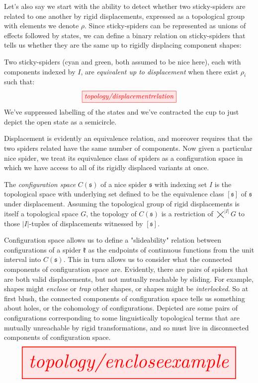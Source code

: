 Let's also say we start with the ability to detect whether two sticky-spiders are related to one another by rigid displacements, expressed as a topological group with elements we denote $\rho$. Since sticky-spiders can be represented as unions of effects followed by states, we can define a binary relation on sticky-spiders that tells us whether they are the same up to rigidly displacing component shapes:

\begin{defn}
Two sticky-spiders (cyan and green, both assumed to be nice here), each with components indexed by $I$, are \emph{equivalent up to displacement} when there exist $\rho_i$ such that:
\[\tikzfig{topology/displacementrelation}\]
We've suppressed labelling of the states and we've contracted the cup to just depict the open state as a semicircle.
\end{defn}

Displacement is evidently an equivalence relation, and moreover requires that the two spiders related have the same number of components. Now given a particular nice spider, we treat its equivalence class of spiders as a configuration space in which we have access to all of its rigidly displaced variants at once.

\begin{defn}\label{defn:configurationspace}
The \emph{configuration space} $C(\mathfrak{s})$ of a nice spider $\mathfrak{s}$ with indexing set $I$ is the topological space with underlying set defined to be the equivalence class $[\mathfrak{s}]$ of $\mathfrak{s}$ under displacement. Assuming the topological group of rigid displacements is itself a topological space $G$, the topology of $C(\mathfrak{s})$ is a restriction of $\bigtimes^{|I|} G$ to those $|I|$-tuples of displacements witnessed by $[\mathfrak{s}]$.
\end{defn}

\begin{example}
Configuration space allows us to define a "slideability" relation between configurations of a spider $\mathfrak{k}$ as the endpoints of continuous functions from the unit interval into $C(\mathfrak{s})$. This in turn allows us to consider what the connected components of configuration space are. Evidently, there are pairs of spiders that are both valid displacements, but not mutually reachable by sliding. For example, shapes might \emph{enclose} or \emph{trap} other shapes, or shapes might be \emph{interlocked}. So at first blush, the connected components of configuration space tells us something about holes, or the cohomology of configurations. Depicted are some pairs of configurations corresponding to some linguistically topological terms that are mutually unreachable by rigid transformations, and so must live in disconnected components of configuration space.
\[\resizebox{\textwidth}{!}{\tikzfig{topology/encloseexample}}\]
\end{example}

